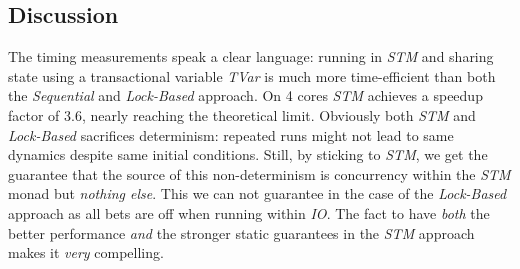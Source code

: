 \subsection{Discussion}
The timing measurements speak a clear language: running in \textit{STM} and sharing state using a transactional variable \textit{TVar} is much more time-efficient than both the \textit{Sequential} and \textit{Lock-Based} approach. On 4 cores \textit{STM} achieves a speedup factor of 3.6, nearly reaching the theoretical limit.
Obviously both \textit{STM} and \textit{Lock-Based} sacrifices determinism: repeated runs might not lead to same dynamics despite same initial conditions. Still, by sticking to \textit{STM}, we get the guarantee that the source of this non-determinism is concurrency within the \textit{STM} monad but \textit{nothing else}. This we can not guarantee in the case of the \textit{Lock-Based} approach as all bets are off when running within \textit{IO}. The fact to have \textit{both} the better performance \textit{and} the stronger static guarantees in the \textit{STM} approach makes it \textit{very} compelling.